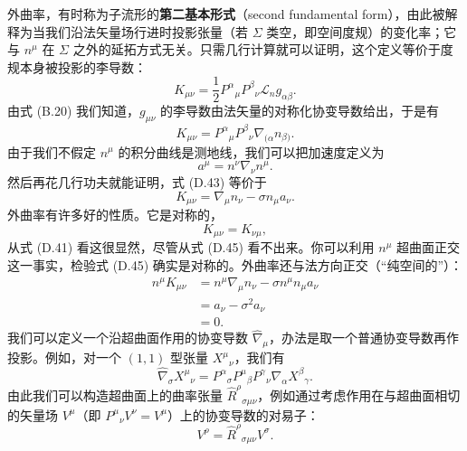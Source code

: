 外曲率，有时称为子流形的\textbf{第二基本形式}（second fundamental form），由此被解释为当我们沿法矢量场行进时投影张量（若 $\Sigma$ 类空，即空间度规）的变化率；它与 $n^\mu$ 在 $\Sigma$ 之外的延拓方式无关。只需几行计算就可以证明，这个定义等价于度规本身被投影的李导数：
\begin{equation*}
K_{\mu\nu} = \frac{1}{2} P^\alpha{}_\mu P^\beta{}_\nu \mathcal{L}_n g_{\alpha\beta}.
\tag{D.42}
\end{equation*}
由式 (B.20) 我们知道，$g_{\mu\nu}$ 的李导数由法矢量的对称化协变导数给出，于是有
\begin{equation*}
K_{\mu\nu} = P^\alpha{}_\mu P^\beta{}_\nu \nabla_{(\alpha} n_{\beta)}.
\tag{D.43}
\end{equation*}
由于我们不假定 $n^\mu$ 的积分曲线是测地线，我们可以把加速度定义为
\begin{equation*}
a^\mu = n^\nu \nabla_\nu n^\mu.
\tag{D.44}
\end{equation*}
然后再花几行功夫就能证明，式 (D.43) 等价于
\begin{equation*}
\boxed{\, K_{\mu\nu} = \nabla_\mu n_\nu - \sigma n_\mu a_\nu. \,}
\tag{D.45}
\end{equation*}
外曲率有许多好的性质。它是对称的，
\begin{equation*}
K_{\mu\nu} = K_{\nu\mu},
\tag{D.46}
\end{equation*}
从式 (D.41) 看这很显然，尽管从式 (D.45) 看不出来。你可以利用 $n^\mu$ 超曲面正交这一事实，检验式 (D.45) 确实是对称的。外曲率还与法方向正交（“纯空间的”）：
\begin{align*}
n^\mu K_{\mu\nu} &= n^\mu \nabla_\mu n_\nu - \sigma n^\mu n_\mu a_\nu \\
&= a_\nu - \sigma^2 a_\nu \\
&= 0.
\tag{D.47}
\end{align*}
我们可以定义一个沿超曲面作用的协变导数 $\widehat{\nabla}_\mu$，办法是取一个普通协变导数再作投影。例如，对一个 $(1,1)$ 型张量 $X^\mu{}_\nu$，我们有
\begin{equation*}
\widehat{\nabla}_\sigma X^\mu{}_\nu = P^\alpha{}_\sigma P^\mu{}_\beta P^\gamma{}_\nu \nabla_\alpha X^\beta{}_\gamma.
\tag{D.48}
\end{equation*}
由此我们可以构造超曲面上的曲率张量 $\widehat{R}^\rho{}_{\sigma\mu\nu}$，例如通过考虑作用在与超曲面相切的矢量场 $V^\mu$（即 $P^\mu{}_\nu V^\nu = V^\mu$）上的协变导数的对易子：
\begin{equation*}
[\widehat{\nabla}_\mu, \widehat{\nabla}_\nu] V^\rho = \widehat{R}^\rho{}_{\sigma\mu\nu} V^\sigma.
\tag{D.49}
\end{equation*}

